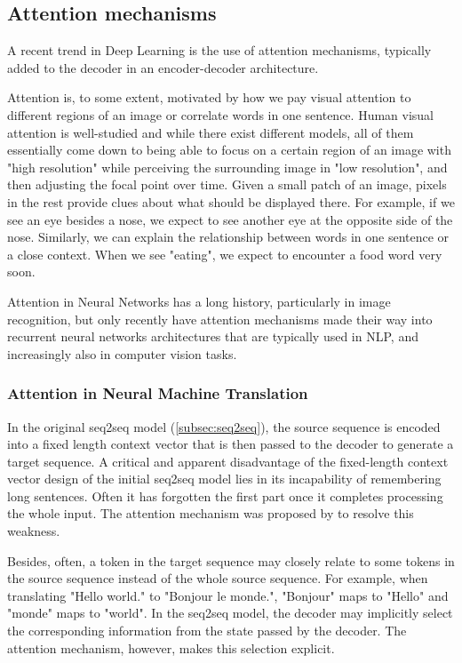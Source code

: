 \subsection{Attention mechanisms}

A recent trend in Deep Learning is the use of attention mechanisms, typically added to the decoder in an encoder-decoder architecture. 

Attention is, to some extent, motivated by how we pay visual attention to different regions of an image or correlate words in one sentence. Human visual attention is well-studied and while there exist different models, all of them essentially come down to being able to focus on a certain region of an image with "high resolution" while perceiving the surrounding image in "low resolution", and then adjusting the focal point over time. Given a small patch of an image, pixels in the rest provide clues about what should be displayed there. For example, if we see an eye besides a nose, we expect to see another eye at the opposite side of the nose. Similarly, we can explain the relationship between words in one sentence or a close context. When we see "eating", we expect to encounter a food word very soon. 

Attention in Neural Networks has a long history, particularly in image recognition, but only recently have attention mechanisms made their way into recurrent neural networks architectures that are typically used in NLP, and increasingly also in computer vision tasks.

\subsubsection{Attention in Neural Machine Translation}

In the original seq2seq model (\cref{subsec:seq2seq}), the source sequence is encoded into a fixed length context vector that is then passed to the decoder to generate a target sequence. A critical and apparent disadvantage of the fixed-length context vector design of the initial seq2seq model lies in its incapability of remembering long sentences. Often it has forgotten the first part once it completes processing the whole input. The attention mechanism was proposed by \citet{Bahdanau2015} to resolve this weakness. 

Besides, often, a token in the target sequence may closely relate to some tokens in the source sequence instead of the whole source sequence. For example, when translating "Hello world." to "Bonjour le monde.", "Bonjour" maps to "Hello" and "monde" maps to "world".  In the seq2seq model, the decoder may implicitly select the corresponding information from the state passed by the decoder. The attention mechanism, however, makes this selection explicit.

